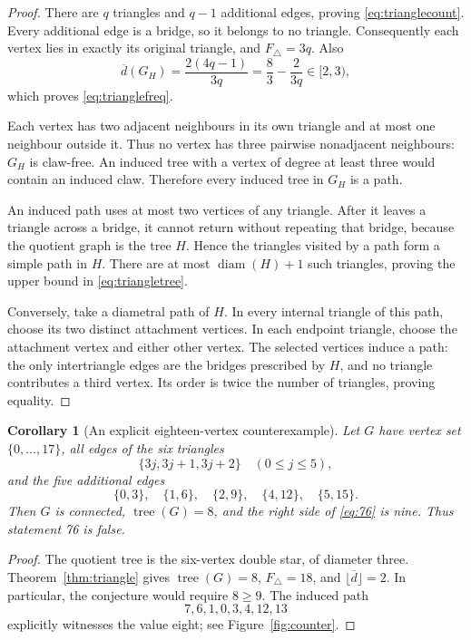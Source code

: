 \documentclass[11pt,a4paper]{article}
\newtheorem{corollary}[theorem]{Corollary}
\theoremstyle{remark}
\newcommand{\tree}{\operatorname{tree}}
\begin{document}
\begin{proof}
There are $q$ triangles and $q-1$ additional edges, proving
\eqref{eq:trianglecount}. Every additional edge is a bridge, so it belongs
to no triangle. Consequently each vertex lies in exactly its original
triangle, and $F_\triangle=3q$. Also
\[
\overline d(G_H)=\frac{2(4q-1)}{3q}
=\frac83-\frac{2}{3q}\in[2,3),
\]
which proves \eqref{eq:trianglefreq}.

Each vertex has two adjacent neighbours in its own triangle and at most
one neighbour outside it. Thus no vertex has three pairwise nonadjacent
neighbours: $G_H$ is claw-free. An induced tree with a vertex of degree
at least three would contain an induced claw. Therefore every induced
tree in $G_H$ is a path.

An induced path uses at most two vertices of any triangle. After it leaves
a triangle across a bridge, it cannot return without repeating that bridge,
because the quotient graph is the tree $H$. Hence the triangles visited
by a path form a simple path in $H$. There are at most
$\operatorname{diam}(H)+1$ such triangles, proving the upper bound in
\eqref{eq:triangletree}.

Conversely, take a diametral path of $H$. In every internal triangle of
this path, choose its two distinct attachment vertices. In each endpoint
triangle, choose the attachment vertex and either other vertex. The
selected vertices induce a path: the only intertriangle edges are the
bridges prescribed by $H$, and no triangle contributes a third vertex.
Its order is twice the number of triangles, proving equality.
\end{proof}

\begin{corollary}[An explicit eighteen-vertex counterexample]\label{cor:18}
Let $G$ have vertex set $\{0,\ldots,17\}$, all edges of the six triangles
\[
\{3j,3j+1,3j+2\}\quad(0\le j\le5),
\]
and the five additional edges
\begin{equation}\label{eq:bridges}
\{0,3\},\quad\{1,6\},\quad\{2,9\},\quad\{4,12\},\quad\{5,15\}.
\end{equation}
Then $G$ is connected, $\tree(G)=8$, and the right side of
\eqref{eq:76} is nine. Thus statement 76 is false.
\end{corollary}
\begin{proof}
The quotient tree is the six-vertex double star, of diameter three.
Theorem~\ref{thm:triangle} gives $\tree(G)=8$, $F_\triangle=18$,
and $\lfloor\overline d\rfloor=2$. In particular, the conjecture
would require $8\ge9$. The induced path
\[
7,6,1,0,3,4,12,13
\]
explicitly witnesses the value eight; see Figure~\ref{fig:counter}.
\end{proof}
\end{document}
